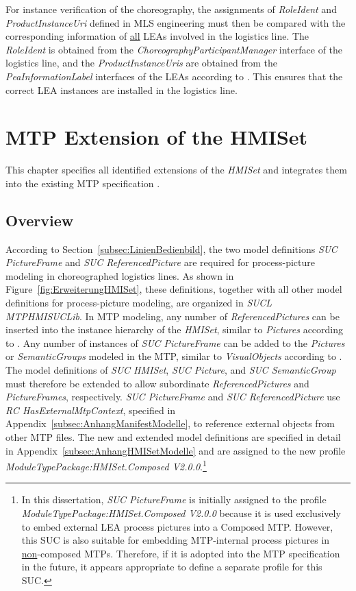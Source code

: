 For instance verification of the choreography, the assignments of \emph{RoleIdent} and \emph{ProductInstanceUri} defined in MLS engineering must then be compared with the corresponding information of \underline{all} LEAs involved in the logistics line. The \emph{RoleIdent} is obtained from the \emph{ChoreographyParticipantManager} interface of the logistics line, and the \emph{ProductInstanceUris} are obtained from the \emph{PeaInformationLabel} interfaces of the LEAs according to \cite{PNO.2025.Part3}. This ensures that the correct LEA instances are installed in the logistics line.


\section{MTP Extension of the HMISet}
\label{sec:AnhangHMISet}

This chapter specifies all identified extensions of the \emph{HMISet} and integrates them into the existing MTP specification \cite{PNO.2025.Part2}.

\subsection{Overview}
\label{subsec:AnhangHMISetUebersicht}

According to Section~\ref{subsec:LinienBedienbild}, the two model definitions \emph{SUC PictureFrame} and \emph{SUC ReferencedPicture} are required for process-picture modeling in choreographed logistics lines. As shown in Figure~\ref{fig:ErweiterungHMISet}, these definitions, together with all other model definitions for process-picture modeling, are organized in \emph{SUCL MTPHMISUCLib}. In MTP modeling, any number of \emph{ReferencedPictures} can be inserted into the instance hierarchy of the \emph{HMISet}, similar to \emph{Pictures} according to \cite{PNO.2025.Part2}. Any number of instances of \emph{SUC PictureFrame} can be added to the \emph{Pictures} or \emph{SemanticGroups} modeled in the MTP, similar to \emph{VisualObjects} according to \cite{PNO.2025.Part2}. The model definitions of \emph{SUC HMISet}, \emph{SUC Picture}, and \emph{SUC SemanticGroup} must therefore be extended to allow subordinate \emph{ReferencedPictures} and \emph{PictureFrames}, respectively. \emph{SUC PictureFrame} and \emph{SUC ReferencedPicture} use \emph{RC HasExternalMtpContext}, specified in Appendix~\ref{subsec:AnhangManifestModelle}, to reference external objects from other MTP files. The new and extended model definitions are specified in detail in Appendix~\ref{subsec:AnhangHMISetModelle} and are assigned to the new profile \emph{ModuleTypePackage:HMISet.Composed V2.0.0}.\footnote{In this dissertation, \emph{SUC PictureFrame} is initially assigned to the profile \emph{ModuleTypePackage:HMISet.Composed V2.0.0} because it is used exclusively to embed external LEA process pictures into a Composed MTP. However, this SUC is also suitable for embedding MTP-internal process pictures in \underline{non}-composed MTPs. Therefore, if it is adopted into the MTP specification in the future, it appears appropriate to define a separate profile for this SUC. }

